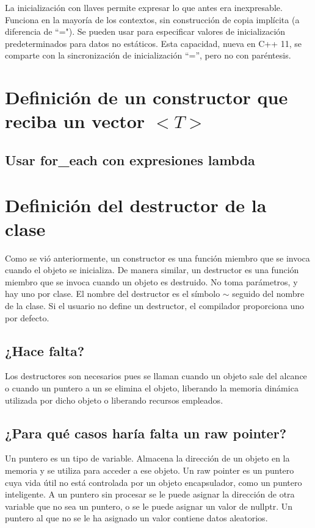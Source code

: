 \documentclass[10pt]{article}
\begin{document}
La inicialización con llaves permite expresar lo que antes era inexpresable. Funciona en la mayoría de los contextos, sin construcción de copia implícita (a diferencia de ``="). Se pueden usar para especificar valores de inicialización predeterminados para datos no estáticos. Esta capacidad, nueva en C++ 11, se comparte con la sincronización de inicialización “=”, pero no con paréntesis. 

\vspace{2em}
\section{Definici\'on de  un constructor que reciba un vector $ <T> $}

\subsection{Usar for\_each con expresiones lambda}

\vspace{2em}
\section{Definici\'on del destructor de la clase}

Como se vi\'o anteriormente, un constructor es una función miembro que se invoca cuando el objeto se inicializa. De manera similar, un destructor es una función miembro que se invoca cuando un objeto es destruido. No toma parámetros, y hay uno por clase. El nombre del destructor es el s\'imbolo $ \sim $ seguido del nombre de la clase. Si el usuario no define un destructor, el compilador proporciona uno por defecto.

\subsection{¿Hace falta?}

Los destructores son necesarios pues se llaman cuando un objeto sale del alcance o cuando un puntero a un se elimina el objeto, liberando la memoria dinámica utilizada por dicho objeto o liberando recursos empleados. 

\subsection{¿Para qué casos haría falta un raw pointer?}

Un puntero es un tipo de variable. Almacena la dirección de un objeto en la memoria y se utiliza para acceder a ese objeto. Un raw pointer es un puntero cuya vida útil no está controlada por un objeto encapsulador, como un puntero inteligente. A un puntero sin procesar se le puede asignar la dirección de otra variable que no sea un puntero, o se le puede asignar un valor de nullptr. Un puntero al que no se le ha asignado un valor contiene datos aleatorios.
\end{document}
